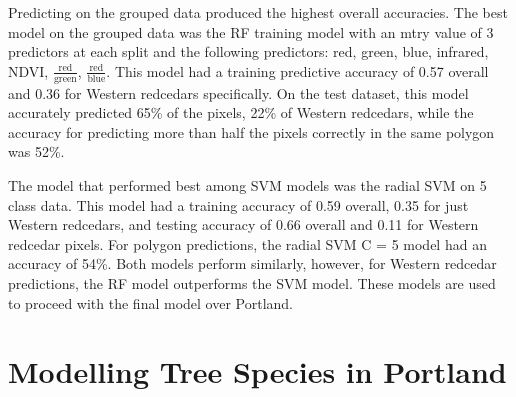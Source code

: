 \documentclass[12pt,twoside]{reedthesis}
\begin{document}
Predicting on the grouped data produced the highest overall accuracies. The best model on the grouped data was the RF training model with an mtry value of 3 predictors at each split and the following predictors: red, green, blue, infrared, NDVI, \(\frac{\mbox{red}}{\mbox{green}}\), \(\frac{\mbox{red}}{\mbox{blue}}\). This model had a training predictive accuracy of 0.57 overall and 0.36 for Western redcedars specifically. On the test dataset, this model accurately predicted 65\% of the pixels, 22\% of Western redcedars, while the accuracy for predicting more than half the pixels correctly in the same polygon was 52\%.

The model that performed best among SVM models was the radial SVM on 5 class data. This model had a training accuracy of 0.59 overall, 0.35 for just Western redcedars, and testing accuracy of 0.66 overall and 0.11 for Western redcedar pixels. For polygon predictions, the radial SVM C = 5 model had an accuracy of 54\%. Both models perform similarly, however, for Western redcedar predictions, the RF model outperforms the SVM model. These models are used to proceed with the final model over Portland.

\hypertarget{modelling-tree-species-in-portland}{%
\section{Modelling Tree Species in Portland}\label{modelling-tree-species-in-portland}}
\end{document}
